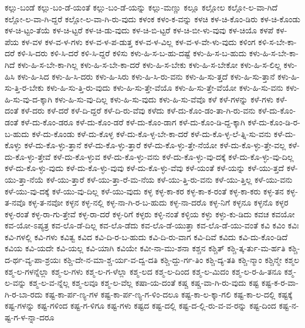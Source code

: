 {ಕಲ್ಲು-ಬಂಡೆ
ಕಲ್ಲು-ಬಂ-ಡೆ-ಯಂತೆ
ಕಲ್ಲು-ಬಂ-ಡೆ-ಯನ್ನು
ಕಲ್ಲು-ಮಣ್ಣು
ಕಲ್ಲೂ
ಕಲ್ಲೋಲ
ಕಲ್ಲೋ-ಲ-ವಾ-ಗಿದೆ
ಕಲ್ಲೋ-ಲ-ವಾ-ಗಿ-ದ್ದರೆ
ಕಲ್ಲೋ-ಲ-ವಾ-ಗಿ-ರು-ವುದು
ಕಳಂಕ
ಕಳಂ-ಕ-ವನ್ನು
ಕಳಚಿ
ಕಳ-ಚಿ-ಕೊಂ-ಡಿರು
ಕಳ-ಚಿ-ಕೊಂಡು
ಕಳ-ಚಿ-ಟ್ಟಂ-ತೆಯೆ
ಕಳ-ಚಿ-ಟ್ಟರೆ
ಕಳ-ಚಿ-ಡು-ವುದು
ಕಳ-ಚಿ-ಬಿ-ಟ್ಟರೆ
ಕಳ-ಚಿ-ಬೀ-ಳು-ವುವು
ಕಳ-ಚಿಯೊ
ಕಳಪೆ
ಕಳ-ಪೆಯ
ಕಳ-ವಳ
ಕಳ-ವ-ಳ-ಗಳು
ಕಳ-ವ-ಳ-ಪ-ಡುತ್ತ
ಕಳ-ವ-ಳ-ವಿಲ್ಲ
ಕಳ-ವ-ಳ-ವೇ-ಳು-ವುದು
ಕಳಿಂಗ
ಕಳಿ-ಸ-ಬೇ-ಕಾ-ದರೆ
ಕಳಿ-ಸಿ-ದರು
ಕಳಿ-ಸಿ-ದರೆ
ಕಳಿ-ಸಿ-ದ್ದರೆ
ಕಳಿಸು
ಕಳು-ಹಿ-ಸ-ಬ-ಹು-ದಷ್ಟೆ
ಕಳು-ಹಿ-ಸ-ಬ-ಹುದು
ಕಳು-ಹಿ-ಸ-ಬೇ-ಕಾ-ಗಿದೆ
ಕಳು-ಹಿ-ಸ-ಬೇ-ಕಾ-ಗಿಲ್ಲ
ಕಳು-ಹಿ-ಸ-ಬೇ-ಕಾ-ದರೆ
ಕಳು-ಹಿ-ಸ-ಬೇಕು
ಕಳು-ಹಿ-ಸ-ಬೇಕೋ
ಕಳು-ಹಿ-ಸ-ಲಿಲ್ಲ
ಕಳು-ಹಿಸಿ
ಕಳು-ಹಿ-ಸಿದ
ಕಳು-ಹಿ-ಸಿ-ದರು
ಕಳು-ಹಿ-ಸಿರು
ಕಳು-ಹಿ-ಸಿ-ರು-ವನು
ಕಳು-ಹಿ-ಸು-ತ್ತದೆ
ಕಳು-ಹಿ-ಸು-ತ್ತಾನೆ
ಕಳು-ಹಿ-ಸು-ತ್ತಿ-ರ-ಬೇಕು
ಕಳು-ಹಿ-ಸು-ತ್ತಿ-ರು-ವುದು
ಕಳು-ಹಿ-ಸು-ತ್ತೇ-ವೆಯೊ
ಕಳು-ಹಿ-ಸು-ತ್ತೇ-ವೆಯೋ
ಕಳು-ಹಿ-ಸು-ವನು
ಕಳು-ಹಿ-ಸು-ವು-ದ-ಕ್ಕಾಗಿ
ಕಳು-ಹಿ-ಸು-ವು-ದಿಲ್ಲ
ಕಳು-ಹಿ-ಸು-ವುದು
ಕಳು-ಹಿ-ಸು-ವೆವೊ
ಕಳೆ
ಕಳೆ-ಗಳನ್ನು
ಕಳೆ-ಗಳು
ಕಳೆ-ದಂತೆ
ಕಳೆ-ದರು
ಕಳೆ-ದರೆ
ಕಳೆ-ದಿ-ದ್ದರೆ
ಕಳೆ-ದಿ-ರು-ವೆವು
ಕಳೆದು
ಕಳೆ-ದು-ಕೊಂ-ಡಂ-ತಾ-ಗಿ-ರು-ವನು
ಕಳೆ-ದು-ಕೊಂ-ಡಂತೆ
ಕಳೆ-ದು-ಕೊಂ-ಡರೂ
ಕಳೆ-ದು-ಕೊಂ-ಡರೆ
ಕಳೆ-ದು-ಕೊಂ-ಡಾಗ
ಕಳೆ-ದು-ಕೊಂ-ಡಿ-ದ್ದ-ಕ್ಕಾಗಿ
ಕಳೆ-ದು-ಕೊಂ-ಡಿ-ರ-ಬ-ಹುದು
ಕಳೆ-ದು-ಕೊಂಡು
ಕಳೆ-ದು-ಕೊಳ್ಳ
ಕಳೆ-ದು-ಕೊ-ಳ್ಳ-ಬೇ-ಕಾ-ದರೆ
ಕಳೆ-ದು-ಕೊ-ಳ್ಳ-ಲೆ-ತ್ನಿ-ಸು-ವನು
ಕಳೆ-ದು-ಕೊಳ್ಳು
ಕಳೆ-ದು-ಕೊ-ಳ್ಳು-ತ್ತಾನೆ
ಕಳೆ-ದು-ಕೊ-ಳ್ಳು-ತ್ತಾರೆ
ಕಳೆ-ದು-ಕೊ-ಳ್ಳು-ತ್ತೇ-ನೆಯೋ
ಕಳೆ-ದು-ಕೊ-ಳ್ಳು-ತ್ತೇ-ವಲ್ಲ
ಕಳೆ-ದು-ಕೊ-ಳ್ಳು-ತ್ತೇವೆ
ಕಳೆ-ದು-ಕೊ-ಳ್ಳುವ
ಕಳೆ-ದು-ಕೊ-ಳ್ಳು-ವನು
ಕಳೆ-ದು-ಕೊ-ಳ್ಳು-ವು-ದಕ್ಕೆ
ಕಳೆ-ದು-ಕೊ-ಳ್ಳು-ವು-ದಿಲ್ಲ
ಕಳೆ-ದು-ಕೊ-ಳ್ಳು-ವುದು
ಕಳೆ-ದು-ಕೊ-ಳ್ಳು-ವುವು
ಕಳೆ-ದು-ಕೊ-ಳ್ಳು-ವೆವು
ಕಳೆ-ಯಂತೆ
ಕಳೆ-ಯನ್ನು
ಕಳೆ-ಯು-ತ್ತದೆ
ಕಳೆ-ಯು-ತ್ತಾ-ನೆಯೆ
ಕಳೆ-ಯು-ತ್ತಾರೆ
ಕಳೆ-ಯು-ತ್ತಾ-ರೆ-ಮ-ನೆಯ
ಕಳೆ-ಯು-ತ್ತಿ-ರು-ವನು
ಕಳೆ-ಯು-ತ್ತಿಲ್ಲ
ಕಳೆ-ಯು-ವನು
ಕಳೆ-ಯು-ವು-ದಕ್ಕೆ
ಕಳೆ-ಯು-ವು-ದಿಲ್ಲ
ಕಳೆ-ಯು-ವುದು
ಕಳ್ಳ
ಕಳ್ಳ-ಕಾ-ಕರ
ಕಳ್ಳ-ಕಾ-ಕ-ರಂತೆ
ಕಳ್ಳ-ಕಾ-ಕರು
ಕಳ್ಳ-ತನ
ಕಳ್ಳ-ತ-ನವೊ
ಕಳ್ಳ-ತ-ನವೋ
ಕಳ್ಳನ
ಕಳ್ಳ-ನಲ್ಲಿ
ಕಳ್ಳ-ನಾ-ಗಿ-ರ-ಬ-ಹುದು
ಕಳ್ಳ-ನಾ-ದರೊ
ಕಳ್ಳ-ನಿಗೆ
ಕಳ್ಳನೂ
ಕಳ್ಳನೊ
ಕಳ್ಳರ
ಕಳ್ಳ-ರಂತೆ
ಕಳ್ಳ-ರಾ-ಗು-ತ್ತೇವೆ
ಕಳ್ಳ-ರಾ-ದರೆ
ಕಳ್ಳ-ರಿಗೆ
ಕಳ್ಳರು
ಕಳ್ಳಿ-ನಂತೆ
ಕಳ್ಳಿಯ
ಕಳ್ಳು
ಕಳ್ಳು-ಕು-ಡಿದು
ಕವಚ
ಕವಯೋ
ಕವ-ಯೋ-ಽಪ್ಯತ್ರ
ಕವ-ಲೊ-ಡೆ-ದಿಲ್ಲ
ಕವ-ಲೊ-ಡೆದು
ಕವ-ಲೊ-ಡೆ-ಯುತ್ತಾ
ಕವ-ಲೊ-ಡೆ-ಯು-ವಂತೆ
ಕವಿ
ಕವಿಂ
ಕವಿಃ
ಕವಿ-ಗಳಲ್ಲಿ
ಕವಿ-ಗಳು
ಕವಿತ್ವ
ಕವಿದ
ಕವಿ-ದಿ-ರ-ಬ-ಹುದು
ಕವಿ-ದಿ-ರು-ವಾಗ
ಕವಿ-ದಿವೆ
ಕವಿದು
ಕವಿ-ದು-ಕೊಂ-ಡಿದೆ
ಕವಿಯ
ಕವಿ-ಯದೇ
ಕವಿ-ಯಲ್ಲ
ಕವಿ-ಯಾಗಿ
ಕವಿಯೇ
ಕವೀ-ನಾ-ಮು-ಶನಾ
ಕಶ್ಚನ
ಕಶ್ಚಿತ್
ಕಶ್ಚಿ-ತ್ಕ-ರ್ತು-ಮ-ರ್ಹತಿ
ಕಶ್ಚಿ-ದ-ರ್ಥ-ವ್ಯ-ಪಾ-ಶ್ರಯಃ
ಕಶ್ಚಿ-ದೇ-ನ-ಮಾ-ಶ್ಚ-ರ್ಯ-ವ-ದ್ವ-ದತಿ
ಕಶ್ಚಿ-ದ್ದು-ರ್ಗ-ತಿಂ
ಕಶ್ಚಿ-ದ್ಯ-ತತಿ
ಕಶ್ಚಿ-ನ್ಮಾಂ
ಕಶ್ಚಿನ್ಮೇ
ಕಶ್ಮಲ
ಕಶ್ಮ-ಲ-ಗಳನ್ನೆಲ್ಲಾ
ಕಶ್ಮ-ಲ-ಗಳು
ಕಶ್ಮ-ಲ-ಗ-ಳೆಲ್ಲಾ
ಕಶ್ಮ-ಲದ
ಕಶ್ಮ-ಲ-ದಿಂದ
ಕಶ್ಮ-ಲ-ಮಿದಂ
ಕಶ್ಮ-ಲ-ರ-ಹಿ-ತನೂ
ಕಶ್ಮ-ಲ-ವನ್ನು
ಕಶ್ಮ-ಲ-ವ-ನ್ನೆಲ್ಲ
ಕಶ್ಮ-ಲವೂ
ಕಶ್ಮ-ಲ-ವೆಲ್ಲ
ಕಷಾ-ಯ-ದಂತೆ
ಕಷ್ಚ
ಕಷ್ಚ-ವಾ-ಗಿ-ರು-ವುದು
ಕಷ್ಟ
ಕಷ್ಟ-ಕ-ರ-ವಾ-ಗಿ-ರ-ಬಾ-ರದು
ಕಷ್ಟ-ಕಾ-ರ್ಪ-ಣ್ಯ-ಗಳ
ಕಷ್ಟ-ಕಾ-ರ್ಪ-ಣ್ಯ-ಗ-ಳಿಂ-ದಲೂ
ಕಷ್ಟ-ಕಾ-ಲ-ಕ್ಕಾ-ಗಲಿ
ಕಷ್ಟ-ಕಾ-ಲ-ದಲ್ಲಿ
ಕಷ್ಟಕ್ಕೆ
ಕಷ್ಟ-ಗಳನ್ನು
ಕಷ್ಟ-ಗಳಿಂದ
ಕಷ್ಟ-ಗ-ಳಿಗೂ
ಕಷ್ಟ-ಗಳು
ಕಷ್ಟದ
ಕಷ್ಟ-ದಲ್ಲಿ
ಕಷ್ಟ-ದ-ಲ್ಲಿ-ರು-ವ-ವ-ರನ್ನು
ಕಷ್ಟ-ದಿಂದ
ಕಷ್ಟ-ನ-ಷ್ಟ-ಗ-ಳ-ನ್ನಾ-ದರೂ
}
